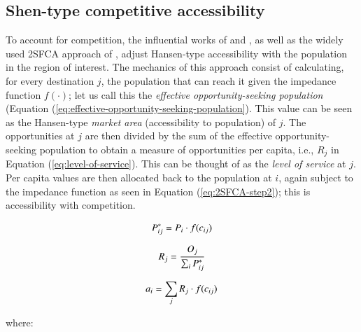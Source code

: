 \documentclass[]{elsarticle} %
\begin{document}
\hypertarget{shen-type-competitive-accessibility}{%
\subsection{Shen-type competitive
accessibility}\label{shen-type-competitive-accessibility}}

To account for competition, the influential works of \citet{shen1998}
and \citet{weibull_axiomatic_1976}, as well as the widely used 2SFCA
approach of \citet{luo2003}, adjust Hansen-type accessibility with the
population in the region of interest. The mechanics of this approach
consist of calculating, for every destination \(j\), the population that
can reach it given the impedance function \(f(\cdot)\); let us call this
the \emph{effective opportunity-seeking population} (Equation
(\ref{eq:effective-opportunity-seeking-population}). This value can be
seen as the Hansen-type \emph{market area} (accessibility to population)
of \(j\). The opportunities at \(j\) are then divided by the sum of the
effective opportunity-seeking population to obtain a measure of
opportunities per capita, i.e., \(R_j\) in Equation
(\ref{eq:level-of-service}). This can be thought of as the \emph{level
of service} at \(j\). Per capita values are then allocated back to the
population at \(i\), again subject to the impedance function as seen in
Equation (\ref{eq:2SFCA-step2}); this is accessibility with competition.

\begin{equation}
\label{eq:effective-opportunity-seeking-population}
P_{ij}^* = P_{i} \cdot f(c_{ij})\\
\end{equation}

\begin{equation}
\label{eq:level-of-service}
R_{j} = \frac{O_{j}}{\sum_i P_{ij}^*}\\
\end{equation}

\begin{equation}
\label{eq:2SFCA-step2}
a_{i} = {\sum_j R_{j} \cdot f(c_{ij})}\\
\end{equation}

\noindent where:
\end{document}
